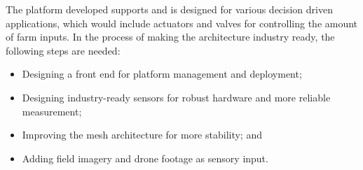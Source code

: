 The platform developed supports and is designed for various decision driven applications, which would include actuators and valves for controlling the amount of farm inputs. In the process of making the architecture industry ready, the following steps are needed:

\begin{itemize}
\item Designing a front end for platform management and deployment;
\item Designing industry-ready sensors for robust hardware and more reliable measurement;
\item Improving the mesh architecture for more stability; and
\item Adding field imagery and drone footage as sensory input.
\end{itemize}